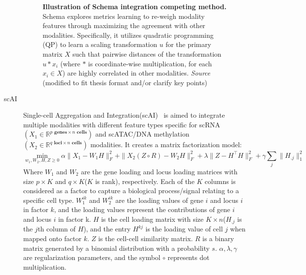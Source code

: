 \begin{description}
\begin{figure}[!ht]
  	\vspace{0.1cm}
  	\caption[Illustration of Schema integration competing method.]{\textbf{Illustration of Schema integration competing method.} Schema explores metrics learning to re-weigh modality features through maximizing the agreement with other modalities. Specifically, it utilizes quadratic programming (QP) to learn a scaling transformation $u$ for the primary matrix $X$ such that pairwise distances of the transformation $u * x_i$ (where $*$ is coordinate-wise multiplication, for each $x_i\in X$) are highly correlated in other modalities. \emph{Source~\cite{singh2021schema}} (modified to fit thesis format and/or clarify key points)
  }
  	\label{fig:Alg_Schema}
  \end{figure}
  \item[scAI]
  Single-cell Aggregation and Integration(scAI)~\citep{jin2020scai} is aimed to integrate multiple modalities with different feature types specific for scRNA $(X_1\in \mathbb{R}^{p \textbf{ genes} \times n \textbf{ cells}})$ and scATAC/DNA methylation$(X_2\in \mathbb{R}^{q \textbf{ loci}\times n \textbf{ cells}})$ modalities. It creates a matrix factorization model:
  \begin{equation}
  \min_{w_1,W_2,H,Z\geq 0} \alpha \|X_1-W_1H\|_F^2 + \|X_2(Z \circ R)-W_2H\|_F^2 + \lambda \|Z-H^\top H\|_F^2 + \gamma\sum_j \|H_{.j}\|_1^2
  \end{equation}
  Where $W_1$ and $W_2$ are the gene loading and locus loading matrices with size $p\times K$ and $q\times K$($K$ is rank), respectively. Each of the $K$ columns is considered as a factor to capture a biological process/signal relating to a specific cell type. $W_1^{ik}$ and $W_2^{ik}$ are the loading values of gene $i$ and locus $i$ in factor $k$, and the loading values represent the contributions of gene $i$ and locus $i$ in factor k. $H$ is the cell loading matrix with size $K\times n$($H_{.j}$ is the $j$th column of $H$), and the entry $H^{kj}$ is the loading value of cell $j$ when mapped onto factor $k$. $Z$ is the cell-cell similarity matrix. $R$ is a binary matrix generated by a binomial distribution with a probability $s$. $\alpha, \lambda, \gamma$ are regularization parameters, and the symbol $\circ$ represents dot multiplication.


\end{description}
